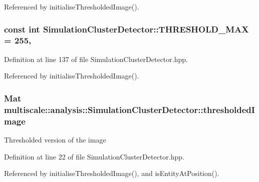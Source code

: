 Referenced by initialise\-Thresholded\-Image().

\hypertarget{classmultiscale_1_1analysis_1_1SimulationClusterDetector_a32b52c0ce7f8a1c8da872aa1cf754317}{
\subsubsection[{T\-H\-R\-E\-S\-H\-O\-L\-D\-\_\-\-M\-A\-X}]{\setlength{\rightskip}{0pt plus 5cm}const int Simulation\-Cluster\-Detector\-::\-T\-H\-R\-E\-S\-H\-O\-L\-D\-\_\-\-M\-A\-X = 255\hspace{0.3cm}{\ttfamily [static]}, {\ttfamily [private]}}}\label{classmultiscale_1_1analysis_1_1SimulationClusterDetector_a32b52c0ce7f8a1c8da872aa1cf754317}


Definition at line 137 of file Simulation\-Cluster\-Detector.\-hpp.



Referenced by initialise\-Thresholded\-Image().

\hypertarget{classmultiscale_1_1analysis_1_1SimulationClusterDetector_aca2aae9914ef643a543a834e61b1cccf}{
\subsubsection[{thresholded\-Image}]{\setlength{\rightskip}{0pt plus 5cm}Mat multiscale\-::analysis\-::\-Simulation\-Cluster\-Detector\-::thresholded\-Image\hspace{0.3cm}{\ttfamily [private]}}}\label{classmultiscale_1_1analysis_1_1SimulationClusterDetector_aca2aae9914ef643a543a834e61b1cccf}
Thresholded version of the image 

Definition at line 22 of file Simulation\-Cluster\-Detector.\-hpp.



Referenced by initialise\-Thresholded\-Image(), and is\-Entity\-At\-Position().

